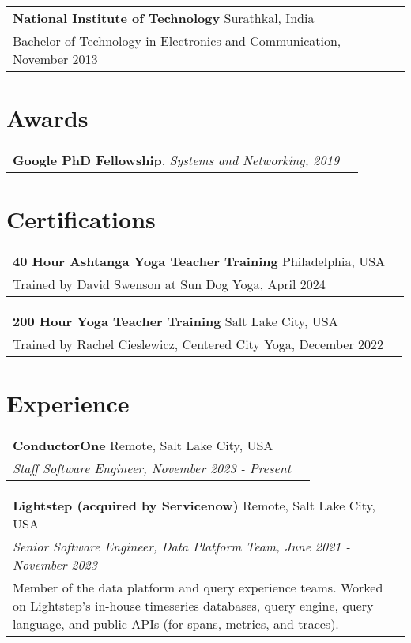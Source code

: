 \documentclass[margin,line]{res}
\begin{document}
\begin{resume}
 \vspace{-7pt}
 \begin{tabular}{@{}p{5.5in}p{4in}}
 {\bf \href{http://www.ece.nitk.ac.in/}{National Institute of
 Technology}} \dotfill Surathkal, India
 \\ {\small Bachelor of Technology in Electronics and Communication, November 2013}
 \end{tabular}

\section{\sc Awards}
\begin{tabular}{@{}p{5.5in}p{4in}}
{\bf Google PhD Fellowship}, {\small\em Systems and Networking, 2019}\\
\end{tabular}

\section{\sc Certifications}
\begin{tabular}{@{}p{5.5in}p{4in}}
{\bf 40 Hour Ashtanga Yoga Teacher Training} \dotfill Philadelphia,
  USA \\
{\small Trained by David Swenson at Sun Dog Yoga, April 2024}\\
\end{tabular}

\vspace{-7pt}
\begin{tabular}{@{}p{5.5in}p{4in}}
{\bf 200 Hour Yoga Teacher Training} \dotfill Salt Lake City,
  USA \\
{\small Trained by Rachel Cieslewicz, Centered City Yoga, December 2022}\\
\end{tabular}

\section{\sc Experience}
\begin{tabular}{@{}p{5.5in}p{4in}}
{\bf ConductorOne} \dotfill Remote, Salt Lake City, USA \\
{\small\em Staff Software Engineer, November 2023 -
Present} \\
\end{tabular}

\vspace{-7pt}
\begin{tabular}{@{}p{5.5in}p{4in}}
{\bf Lightstep (acquired by Servicenow)} \dotfill Remote, Salt Lake City, USA \\
{\small\em Senior Software Engineer, Data Platform Team, June 2021 -
November 2023} \\
{\small Member of the data platform and query experience teams. Worked
on Lightstep's in-house timeseries databases, query engine, query
language, and public APIs (for spans, metrics, and traces).} \\


\end{tabular}
\end{resume}
\end{document}
